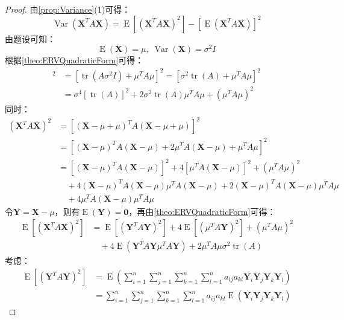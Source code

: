 \begin{proof}
	由\cref{prop:Variance}(1)可得：
	\begin{equation*}
		\operatorname{Var}(\mathbf{X}^TA\mathbf{X})=\operatorname{E}[(\mathbf{X}^TA\mathbf{X})^2]-[\operatorname{E}(\mathbf{X}^TA\mathbf{X})]^2 
	\end{equation*}
	由题设可知：
	\begin{equation*}
		\operatorname{E}(\mathbf{X})=\mu,\;\operatorname{Var}(\mathbf{X})=\sigma^2I
	\end{equation*}
	根据\cref{theo:ERVQuadraticForm}可得：
	\begin{align*}
		[\operatorname{E}(\mathbf{X}^TA\mathbf{X})]^2&=[\operatorname{tr}(A\sigma^2I)+\mu^TA\mu]^2=[\sigma^2\operatorname{tr}(A)+\mu^TA\mu]^2 \\
		&=\sigma^4[\operatorname{tr}(A)]^2+2\sigma^2\operatorname{tr}(A)\mu^TA\mu+(\mu^TA\mu)^2
	\end{align*}
	同时：
	\begin{align*}
		(\mathbf{X}^TA\mathbf{X})^2
		&=[(\mathbf{X}-\mu+\mu)^TA(\mathbf{X}-\mu+\mu)]^2 \\
		&=[(\mathbf{X}-\mu)^TA(\mathbf{X}-\mu)+2\mu^TA(\mathbf{X}-\mu)+\mu^TA\mu]^2 \\
		&=[(\mathbf{X}-\mu)^TA(\mathbf{X}-\mu)]^2+4[\mu^TA(\mathbf{X}-\mu)]^2+(\mu^TA\mu)^2 \\
		&\quad+4(\mathbf{X}-\mu)^TA(\mathbf{X}-\mu)\mu^TA(\mathbf{X}-\mu)+2(\mathbf{X}-\mu)^TA(\mathbf{X}-\mu)\mu^TA\mu \\
		&\quad+4\mu^TA(\mathbf{X}-\mu)\mu^TA\mu
	\end{align*}
	令$\mathbf{Y}=\mathbf{X}-\mu$，则有$\operatorname{E}(\mathbf{Y})=\mathbf{0}$，再由\cref{theo:ERVQuadraticForm}可得：
	\begin{align*}
		\operatorname{E}[(\mathbf{X}^TA\mathbf{X})^2]
		&=\operatorname{E}[(\mathbf{Y}^TA\mathbf{Y})^2]+4\operatorname{E}[(\mu^TA\mathbf{Y})^2]+(\mu^TA\mu)^2 \\
		&\quad+4\operatorname{E}(\mathbf{Y}^TA\mathbf{Y}\mu^TA\mathbf{Y})+2\mu^TA\mu\sigma^2\operatorname{tr}(A)
	\end{align*}
	考虑：
	\begin{align*}
		\operatorname{E}[(\mathbf{Y}^TA\mathbf{Y})^2]
		&=\operatorname{E}\left(\sum_{i=1}^{n}\sum_{j=1}^{n}\sum_{k=1}^{n}\sum_{l=1}^{n}a_{ij}a_{kl}\mathbf{Y}_i\mathbf{Y}_j\mathbf{Y}_k\mathbf{Y}_l\right) \\
		&=\sum_{i=1}^{n}\sum_{j=1}^{n}\sum_{k=1}^{n}\sum_{l=1}^{n}a_{ij}a_{kl}\operatorname{E}(\mathbf{Y}_i\mathbf{Y}_j\mathbf{Y}_k\mathbf{Y}_l)

\end{align*}
\end{proof}
